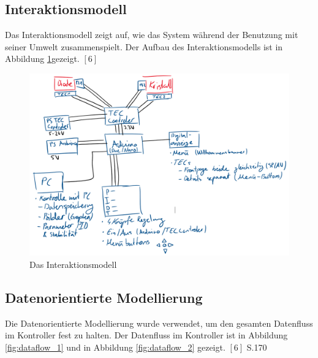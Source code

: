 \subsection{Interaktionsmodell}
Das Interaktionsmodell zeigt auf, wie das System während der Benutzung mit seiner Umwelt zusammenspielt. Der Aufbau des Interaktionsmodells ist in Abbildung \ref{fig:interaktionsmodell}gezeigt. $[6]$

\begin{figure}
    \centering
    \includegraphics{98_images/scheme_wiring.PNG}
    \caption{Das Interaktionsmodell}
    \label{fig:interaktionsmodell}
\end{figure}

\subsection{Datenorientierte Modellierung}
Die Datenorientierte Modellierung wurde verwendet, um den gesamten Datenfluss im Kontroller fest zu halten. Der Datenfluss im Kontroller ist in Abbildung \ref{fig:dataflow_1} und in Abbildung \ref{fig:dataflow_2} gezeigt. $[6]$ S.170

